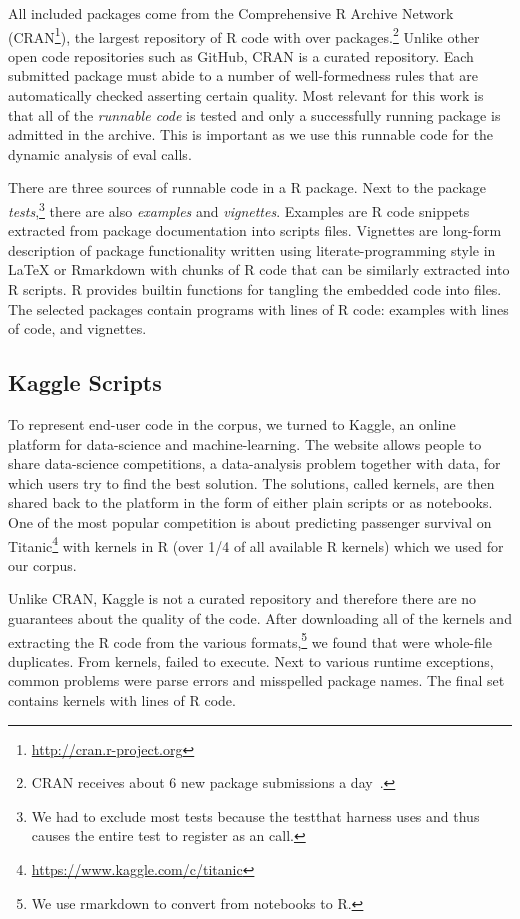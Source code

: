 \documentclass[conference]{IEEEtran}
\begin{document}
All included packages come from the Comprehensive R Archive Network
(CRAN\footnote{\url{http://cran.r-project.org}}), the largest repository of R
code with over \CorpusAllCranRnd packages.\footnote{CRAN receives about 6 new
  package submissions a day~\cite{Ligges2017}.} Unlike other open code
repositories such as GitHub, CRAN is a curated repository. Each submitted
package must abide to a number of well-formedness rules that are automatically
checked asserting certain quality. Most relevant for this work is that all of
the \emph{runnable code} is tested and only a successfully running package is
admitted in the archive. This is important as we use this runnable code for the
dynamic analysis of eval calls.

There are three sources of runnable code in a R package. Next to the package
\emph{tests},\footnote{We had to exclude most tests because the {testthat}
  harness uses \eval and thus causes the entire test to register as an \eval
  call.} there are also \emph{examples} and \emph{vignettes}. Examples are R
code snippets extracted from package documentation into scripts files.
Vignettes are long-form description of package functionality written using
literate-programming style in \LaTeX\xspace or Rmarkdown with chunks of R
code that can be similarly extracted into R scripts. R provides builtin
functions for tangling the embedded code into files.  The selected packages
contain \CorpusPackagePrograms programs with \CorpusPackageProgramsCodeRnd
lines of R code: \CorpusExamplesProgramsRnd examples with
\CorpusExamplesCodeRnd lines of code, and \CorpusVignettesProgramsRnd
vignettes.

\subsection{Kaggle Scripts}

To represent end-user code in the corpus, we turned to Kaggle, an online
platform for data-science and machine-learning. The website allows people to
share data-science competitions, a data-analysis problem together with data,
for which users try to find the best solution. The solutions, called
{kernels}, are then shared back to the platform in the form of either plain
scripts or as notebooks.  One of the most popular competition is about
predicting passenger survival on
Titanic\footnote{\url{https://www.kaggle.com/c/titanic}} with \CorpusKaggle
kernels in R (over 1/4 of all available R kernels) which we used for our
corpus.

Unlike CRAN, Kaggle is not a curated repository and therefore there are no
guarantees about the quality of the code. After downloading all of the
\CorpusKaggle kernels and extracting the R code from the various
formats,\footnote{We use {\sf rmarkdown} to convert from notebooks to R.} we
found that \CorpusDuplicatedKaggle were whole-file duplicates. From
\CorpusRunnableKaggle kernels, \CorpusFailedKaggle failed to execute. Next
to various runtime exceptions, common problems were parse errors and
misspelled package names.  The final set contains \CorpusFinishedKaggle
kernels with \CorpusFinishedKaggleCodeRnd lines of R code.
\end{document}
